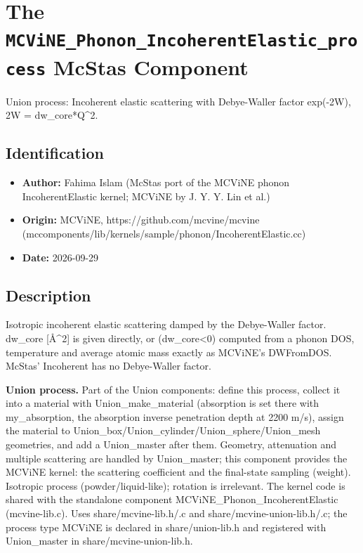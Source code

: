 \section{The \texttt{MCViNE\_Phonon\_IncoherentElastic\_process} McStas Component}
Union process: Incoherent elastic scattering with Debye-Waller factor exp(-2W), 2W = dw\_core*Q\textasciicircum{}2.

\subsection*{Identification}
\begin{itemize}
  \item \textbf{Author:} Fahima Islam (McStas port of the MCViNE phonon IncoherentElastic kernel; MCViNE by J. Y. Y. Lin et al.)
  \item \textbf{Origin:} MCViNE, https://github.com/mcvine/mcvine (mccomponents/lib/kernels/sample/phonon/IncoherentElastic.cc)
  \item \textbf{Date:} 2026-09-29
\end{itemize}

\subsection*{Description}
Isotropic incoherent elastic scattering damped by the Debye-Waller factor. dw\_core [\AA{}\textasciicircum{}2] is given directly, or (dw\_core\textless{}0) computed from a phonon DOS, temperature and average atomic mass exactly as MCViNE's DWFromDOS. McStas' Incoherent has no Debye-Waller factor.

\textbf{Union process.} Part of the Union components: define this process, collect it into a material with Union\_make\_material (absorption is set there with my\_absorption, the absorption inverse penetration depth at 2200 m/s), assign the material to Union\_box/Union\_cylinder/Union\_sphere/Union\_mesh geometries, and add a Union\_master after them. Geometry, attenuation and multiple scattering are handled by Union\_master; this component provides the MCViNE kernel: the scattering coefficient and the final-state sampling (weight). Isotropic process (powder/liquid-like); rotation is irrelevant. The kernel code is shared with the standalone component MCViNE\_Phonon\_IncoherentElastic (mcvine-lib.c). Uses share/mcvine-lib.h/.c and share/mcvine-union-lib.h/.c; the process type MCViNE is declared in share/union-lib.h and registered with Union\_master in share/mcvine-union-lib.h.

